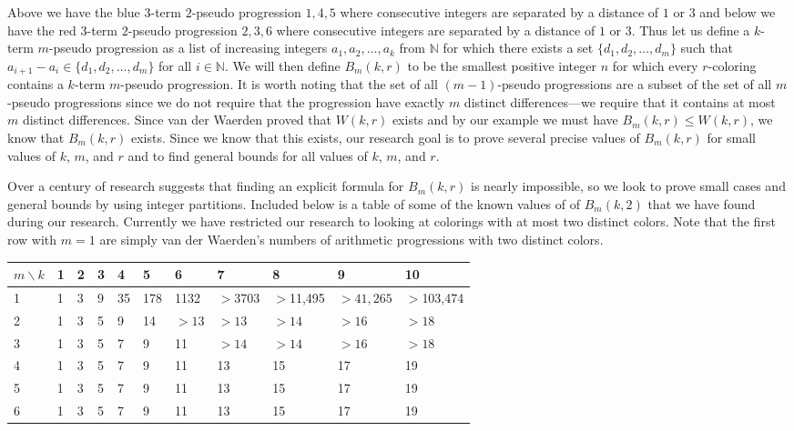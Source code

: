\documentclass[ fontsize=10pt,twoside]{scrartcl}	%
\begin{document}
Above we have the blue $3$-term $2$-pseudo progression $1,4,5$ where  consecutive integers are separated by a distance of $1$ or $3$ and below we have the red $3$-term $2$-pseudo progression $2,3,6$ where consecutive integers are separated by a distance of $1$ or $3$. Thus let us define a $k$-term $m$-pseudo progression as a list of increasing integers $a_1,a_2,\ldots,a_k$ from $\mathbb{N}$ for which there exists a set $\{d_1,d_2,\ldots,d_{m}\}$ such that $a_{i+1} - a_i \in \{d_1,d_2,\ldots,d_{m}\}$ for all $i \in \mathbb{N}$. We will then define $B_m(k,r)$ to be the smallest positive integer $n$ for which every $r$-coloring contains a $k$-term $m$-pseudo progression. It is worth noting that the set of all $(m-1)$-pseudo progressions are a subset of the set of all $m$-pseudo progressions since we do not require that the progression have exactly $m$ distinct differences---we require that it contains at most $m$ distinct differences. Since van der Waerden proved that $W(k,r)$ exists and by our example we must have $B_m(k,r) \leq W(k,r)$, we know that $B_m(k,r)$ exists. Since we know that this exists, our research goal is to prove several precise values of $B_m(k,r)$ for small values of $k$, $m$, and $r$ and to find general bounds for all values of $k$, $m$, and $r.$

Over a century of research suggests that finding an explicit formula for $B_m(k,r)$ is nearly impossible, so we look to prove small cases and general bounds by using integer partitions. Included below is a table of some of the known values of of $B_m(k,2)$ that we have found during our research. Currently we have restricted our research to looking at colorings with at most two distinct colors. Note that the first row with $m = 1$ are simply van der Waerden's numbers of arithmetic progressions with two distinct colors.

\begin{center}
\begin{tabular}{ | m | m | m | m | m | m | m | m | m | m | m |  } 
\hline
$m\backslash k$& 1 & 2 & 3 & 4 & 5 & 6 & 7 & 8 & 9 & 10  \\ 
\hline
1 & 1 & 3 & 9 & 35 & 178  & 1132 & $>$3703  & $>$11,495 & $>41,265$  & $>$103,474   \\ 
\hline
2 & 1 & 3 & 5 & 9 & 14 & $>13$ & $>13$ & $>14$ & $>16$ & $>18$\\
\hline
3 & 1 & 3 & 5 & 7 & 9 & 11 & $>14$ & $>14$ & $>16$ & $>18$ \\
\hline
4 & 1 & 3 & 5 & 7 & 9 & 11 & 13 & 15 & 17 & 19  \\
\hline
5 & 1 & 3 & 5 & 7 & 9 & 11 & 13 & 15 & 17 & 19  \\
\hline
6 & 1 & 3 & 5 & 7 & 9 & 11 & 13 & 15 & 17 & 19 \\ 
\hline

\end{tabular}
\end{center}\\
\end{document}
